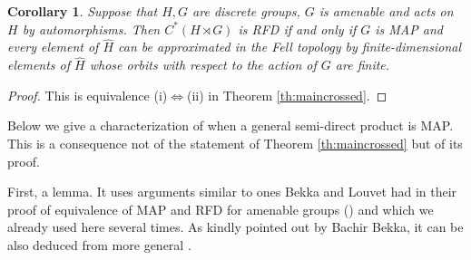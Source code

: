\documentclass[11 pt, leqno, hidelinks]{amsart}%
\theoremstyle{plain}
\newtheorem{corollary}[theorem]{Corollary}
\numberwithin{equation}{section}
\begin{document}
\begin{corollary}\label{SemidirectProductsVersion} Suppose that $H, G$ are discrete groups, $G$ is amenable and acts on $H$ by automorphisms. Then $C^*(H \rtimes G)$ is RFD if and only if $G$ is MAP and every element of $\widehat H$ can be approximated in the Fell topology by finite-dimensional elements of $\widehat H$ whose orbits with respect to the action of $G$ are finite.	
\end{corollary}
\begin{proof}
This is equivalence (i)$\Longleftrightarrow$(ii) in Theorem \ref{th:maincrossed}.
\end{proof}

	Below we give a characterization of when a general semi-direct product is MAP. This is a consequence not of the statement of  Theorem \ref{th:maincrossed} but of its proof.

First, a lemma. It uses arguments similar to ones  Bekka and Louvet had in their proof of equivalence of MAP and RFD for amenable groups (\cite{BekkaLouvet}) and  which we already used here several times. As kindly pointed out by Bachir Bekka, it can be also deduced from more general \cite[Corollary 1.8]{BekkaInvariant}.
\end{document}
